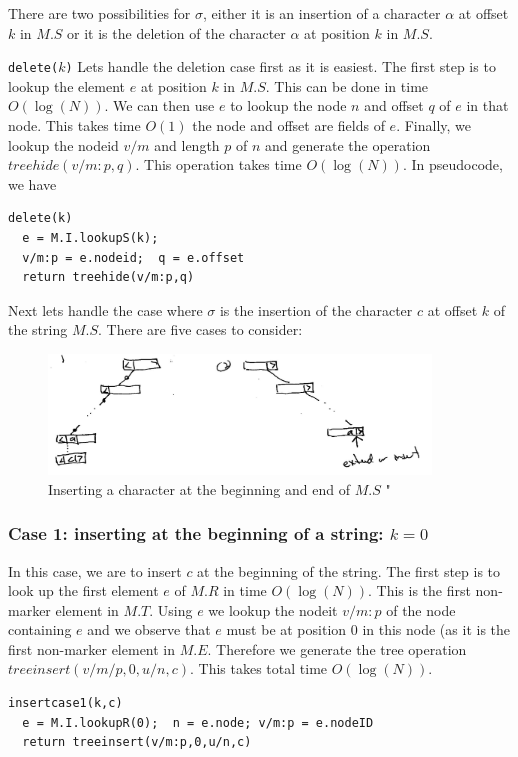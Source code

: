 \documentclass{amsart}
\begin{document}
There are two possibilities for $\sigma$, either it is an insertion of a character $\alpha$ at offset $k$ in $M.S$ or it is the deletion of the character $\alpha$ at position $k$ in $M.S$.  

 {{\tt delete($k$)}} 
Lets handle the deletion case first as it is easiest. The first step is to lookup the element $e$ at position $k$ in $M.S$. This can be done in time $O(\log(N))$.
We can then use $e$ to lookup the node $n$ and offset $q$ of $e$ in that node.
This takes time $O(1)$ the node and offset are fields of $e$. Finally, we lookup the
nodeid $v/m$ and length $p$ of $n$ and generate the operation $treehide(v/m:p,q)$. This operation takes time $O(\log(N))$. In pseudocode, we have
\begin{verbatim}
delete(k)
  e = M.I.lookupS(k);
  v/m:p = e.nodeid;  q = e.offset
  return treehide(v/m:p,q)
\end{verbatim}

Next lets handle the case where $\sigma$ is the insertion of the character $c$
at offset $k$ of the string $M.S$.  There are five cases to consider:

\begin{figure}[h]
\centering
\includegraphics[width=4.0in]{insertAtFront002.jpg}
\caption{Inserting a character at the beginning and end of $M.S$ \label{fig:frontinsert}"}
\end{figure}

\subsubsection{Case 1: inserting at the beginning of a string: $k=0$}
In this case, we are to insert $c$ at the beginning of the string.
The first step is to look up the first element $e$ of $M.R$ in time $O(\log(N))$.
This is the first non-marker element in $M.T$. Using $e$ we lookup the
nodeit $v/m:p$ of the node containing $e$ and we observe that $e$ must be at position 0 in this node (as it is the first non-marker element in $M.E$. Therefore
we generate the tree operation $treeinsert(v/m/p,0,u/n,c)$. This takes total time $O(\log(N))$.
\begin{verbatim}
insertcase1(k,c)
  e = M.I.lookupR(0);  n = e.node; v/m:p = e.nodeID
  return treeinsert(v/m:p,0,u/n,c)
\end{verbatim}
\end{document}
